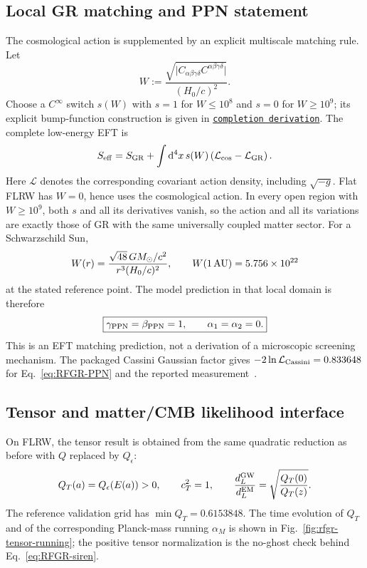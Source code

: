\documentclass[11pt,a4paper]{article}
\renewcommand{\dd}{\mathrm{d}}
\newcommand{\RFGRepoURL}{https://github.com/MartinPetrasek123/MartinPetrasek123}
\newcommand{\RFGRepoNamed}[2]{\href{\RFGRepoURL/blob/main/r-universe-complete-chain/rfg-r-completion/r\_universe\_completion/#1}{\texttt{#2}}}
\begin{document}
\subsection{Local GR matching and PPN statement}

The cosmological action is supplemented by an explicit multiscale matching
rule. Let
\begin{equation}
 W:=\frac{\sqrt{\lvert C_{\alpha\beta\gamma\delta}
 C^{\alpha\beta\gamma\delta}\rvert}}{(H_0/c)^2}.
 \label{eq:RFGR-Weyl}
\end{equation}
Choose a \(C^\infty\) switch \(s(W)\) with \(s=1\) for \(W\leq10^8\)
and \(s=0\) for \(W\geq10^9\); its explicit bump-function construction is
given in \RFGRepoNamed{docs/completion\_derivation.md}{completion derivation}. The complete
low-energy EFT is
\begin{equation}
 S_{\rm eff}=S_{\rm GR}+\int\dd^4x\,s(W)
 \left(\mathcal L_{\rm cos}-\mathcal L_{\rm GR}\right).
 \label{eq:RFGR-matching}
\end{equation}
Here \(\mathcal L\) denotes the corresponding covariant action density,
including \(\sqrt{-g}\). Flat FLRW has \(W=0\), hence uses the cosmological
action. In every open region with \(W\geq10^9\), both \(s\) and all its
derivatives vanish, so the action and all its variations are exactly those of
GR with the same universally coupled matter sector. For a Schwarzschild Sun,
\begin{equation}
 W(r)=\frac{\sqrt{48}\,GM_\odot/c^2}{r^3(H_0/c)^2},
 \qquad W(1\,{\rm AU})=5.756\times10^{22}
\end{equation}
at the stated reference point. The model prediction in that local domain is
therefore
\begin{equation}
 \boxed{\gamma_{\rm PPN}=\beta_{\rm PPN}=1,\qquad
 \alpha_1=\alpha_2=0.}
 \label{eq:RFGR-PPN}
\end{equation}
This is an EFT matching prediction, not a derivation of a microscopic
screening mechanism. The packaged Cassini Gaussian factor gives
\(-2\ln\mathcal L_{\rm Cassini}=0.833648\) for Eq.~\eqref{eq:RFGR-PPN}
and the reported measurement~\cite{Cassini}.

\subsection{Tensor and matter/CMB likelihood interface}

On FLRW, the tensor result is obtained from the same quadratic reduction as
before with \(Q\) replaced by \(Q_\epsilon\):
\begin{equation}
 Q_T(a)=Q_\epsilon(E(a))>0,\qquad c_T^2=1,\qquad
 \frac{d_L^{\rm GW}}{d_L^{\rm EM}}=
 \sqrt{\frac{Q_T(0)}{Q_T(z)}}.
 \label{eq:RFGR-siren}
\end{equation}
The reference validation grid has \(\min Q_T=0.6153848\). The time evolution
of \(Q_T\) and of the corresponding Planck-mass running \(\alpha_M\) is shown
in Fig.~\ref{fig:rfgr-tensor-running}; the positive tensor normalization is
the no-ghost check behind Eq.~\eqref{eq:RFGR-siren}.
\end{document}
